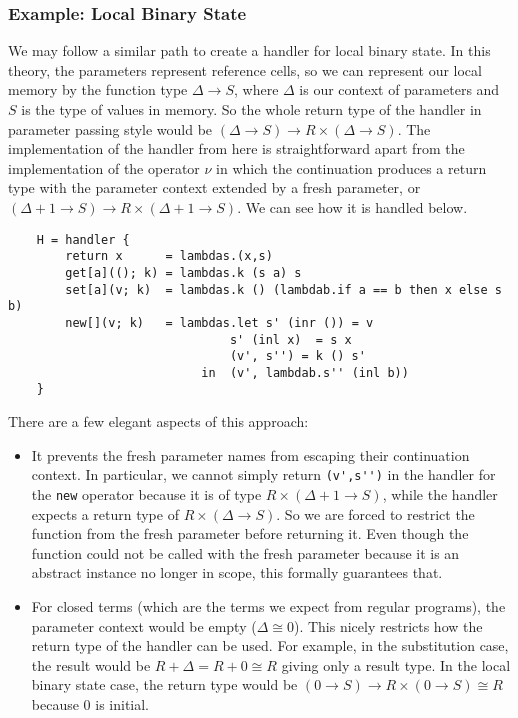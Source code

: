\documentclass{scrartcl}
\theoremstyle{definition}
\begin{document}
\subsubsection{Example: Local Binary State}

We may follow a similar path to create a handler for local binary state. In this theory, the parameters represent reference cells, so we can represent our local memory by the function type $\Delta \to S$, where $\Delta$ is our context of parameters and $S$ is the type of values in memory. So the whole return type of the handler in parameter passing style would be $(\Delta \to S) \to R \times (\Delta \to S)$. The implementation of the handler from here is straightforward apart from the implementation of the operator $\nu$ in which the continuation produces a return type with the parameter context extended by a fresh parameter, or $(\Delta +1 \to S) \to R \times (\Delta + 1 \to S)$. We can see how it is handled below.
\begin{lstlisting}
    H = handler {
        return x      = lambdas.(x,s)
        get[a]((); k) = lambdas.k (s a) s
        set[a](v; k)  = lambdas.k () (lambdab.if a == b then x else s b)
        new[](v; k)   = lambdas.let s' (inr ()) = v
                               s' (inl x)  = s x
                               (v', s'') = k () s'
                           in  (v', lambdab.s'' (inl b))
    }
\end{lstlisting}
There are a few elegant aspects of this approach:
\begin{itemize}
    \item It prevents the fresh parameter names from escaping their continuation context. In particular, we cannot simply return \lstinline{(v',s'')} in the handler for the \lstinline{new} operator because it is of type $R\times (\Delta+1\to S)$, while the handler expects a return type of $R\times (\Delta \to S)$. So we are forced to restrict the function from the fresh parameter before returning it. Even though the function could not be called with the fresh parameter because it is an abstract instance no longer in scope, this formally guarantees that.
    \item For closed terms (which are the terms we expect from regular programs), the parameter context would be empty ($\Delta \cong 0$). This nicely restricts how the return type of the handler can be used. For example, in the substitution case, the result would be $R + \Delta = R + 0 \cong R$ giving only a result type. In the local binary state case, the return type would be $(0 \to S) \to R \times (0 \to S) \cong R$ because $0$ is initial.
\end{itemize}
\end{document}
